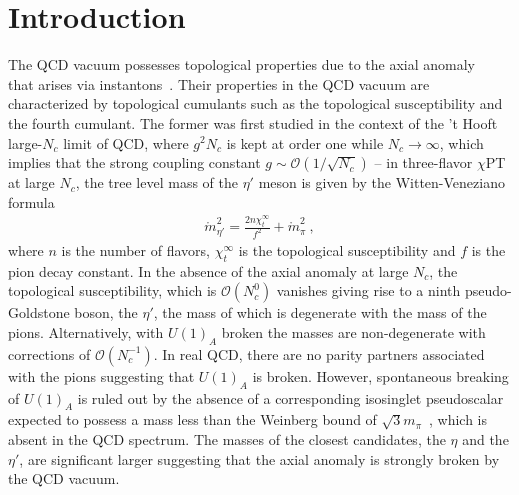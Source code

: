 \documentclass[12pt]{elsarticle}
\begin{document}
\section{Introduction}
The QCD vacuum possesses topological properties due to the axial anomaly~\cite{Crewther:1977ce,Witten:1979vv,Veneziano:1979ec,DiVecchia:1980yfw} that arises via instantons~\cite{tHooft:1976rip, tHooft:1976snw}. Their properties in the QCD vacuum are characterized by topological cumulants such as the topological susceptibility and the fourth cumulant. The former was first studied in the context of the 't Hooft large-$N_{c}$ limit of QCD, where $g^{2}N_{c}$ is kept at order one while $N_{c}\rightarrow\infty$, which implies that the strong coupling constant $g\sim\mathcal{O}(1/\sqrt{N_{c}})$ -- in three-flavor $\chi$PT at large $N_{c}$, the tree level mass of the $\eta'$ meson is given by the Witten-Veneziano formula~\cite{Witten:1979vv,Veneziano:1979ec}
\begin{equation}
\begin{split}
\mathring{m}_{\eta'}^{2}=\frac{2n\chi_{t}^{\infty}}{f^{2}}+\mathring{m}_{\pi}^{2}\ ,
\end{split}
\end{equation}
where $n$ is the number of flavors, $\chi_{t}^{\infty}$ is the topological susceptibility and $f$ is the pion decay constant. In the absence of the axial anomaly at large $N_{c}$, the topological susceptibility, which is $\mathcal{O}(N_{c}^{0})$ vanishes giving rise to a ninth pseudo-Goldstone boson, the $\eta'$, the mass of which is degenerate with the mass of the pions. Alternatively, with $U(1)_{A}$ broken the masses are non-degenerate with corrections of $\mathcal{O}(N_{c}^{-1})$. In real QCD, there are no parity partners associated with the pions suggesting that $U(1)_{A}$ is broken. However, spontaneous breaking of $U(1)_{A}$ is ruled out by the absence of a corresponding isosinglet pseudoscalar expected to possess a mass less than the Weinberg bound of $\sqrt{3}m_{\pi}$~\cite{Weinberg:1975ui}, which is absent in the QCD spectrum. The masses of the closest candidates, the $\eta$ and the $\eta'$, are significant larger suggesting that the axial anomaly is strongly broken by the QCD vacuum. 
\end{document}
